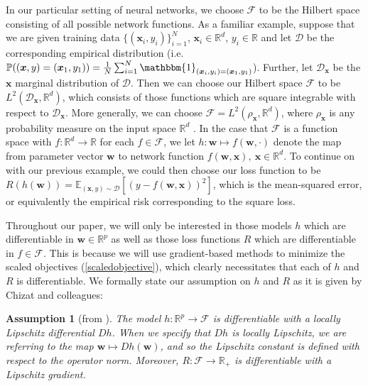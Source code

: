 \documentclass{article}
\newtheorem*{assumption}{Assumption}
\begin{document}
In our particular setting of neural networks, we choose $\mathcal{F}$ to be the Hilbert space consisting of all possible network functions. As a familiar example, suppose that we are given training data $\{ (\boldsymbol{x}_i, y_i)\}_{i=1}^N$, $\boldsymbol{x}_i \in \mathbb{R}^d$, $y_i \in \mathbb{R}$ and let $\mathcal{D}$ be the corresponding empirical distribution (i.e. $\mathbb{P}( (\boldsymbol{x}, y) = (\boldsymbol{x}_1, y_1)) = \frac{1}{N} \sum_{i=1}^N \mathbbm{1}_{(\boldsymbol{x}_i, y_i) = (\boldsymbol{x}_1, y_1)}$). Further, let $\mathcal{D}_{\boldsymbol{x}}$ be the $\boldsymbol{x}$ marginal distribution of $\mathcal{D}$. Then we can choose our Hilbert space $\mathcal{F}$ to be $L^2(\mathcal{D}_{\boldsymbol{x}}, \mathbb{R}^d)$, which consists of those functions which are square integrable with respect to $\mathcal{D}_{\boldsymbol{x}}$. More generally, we can choose $\mathcal{F} = L^2(\rho_{\boldsymbol{x}}, \mathbb{R}^d)$, where $\rho_{\boldsymbol{x}}$ is any probability measure on the input space $\mathbb{R}^d$ \cite{chizat2018lazy}. In the case that $\mathcal{F}$ is a function space with $f: \mathbb{R}^d \rightarrow \mathbb{R}$ for each $f \in \mathcal{F}$, we let $h: \boldsymbol{w} \mapsto f(\boldsymbol{w}, \cdot)$ denote the map from parameter vector $\boldsymbol{w}$ to network function $f(\boldsymbol{w}, \boldsymbol{x}), \ \boldsymbol{x} \in \mathbb{R}^d$. To continue on with our previous example, we could then choose our loss function to be $R(h(\boldsymbol{w})) = \mathbb{E}_{(\boldsymbol{x}, y) \sim \mathcal{D}} \left[ (y - f(\boldsymbol{w}, \boldsymbol{x}))^2 \right]$, which is the mean-squared error, or equivalently the empirical risk corresponding to the square loss.

Throughout our paper, we will only be interested in those models $h$ which are differentiable in $\boldsymbol{w} \in \mathbb{R}^p$ as well as those loss functions $R$ which are differentiable in $f \in \mathcal{F}$. This is because we will use gradient-based methods to minimize the scaled objectives (\ref{scaledobjective}), which clearly necessitates that each of $h$ and $R$ is differentiable. We formally state our assumption on $h$ and $R$ as it is given by Chizat and colleagues:
\begin{assumption}[from \cite{chizat2018lazy}]\label{assumption1}
The model $h: \mathbb{R}^p \rightarrow \mathcal{F}$ is differentiable with a locally Lipschitz differential $Dh$. When we specify that $Dh$ is locally Lipschitz, we are referring to the map $\boldsymbol{w} \mapsto Dh(\boldsymbol{w})$, and so the Lipschitz constant is defined with respect to the operator norm. Moreover, $R: \mathcal{F} \rightarrow \mathbb{R}_+$ is differentiable with a Lipschitz gradient.
\end{assumption}
\end{document}
